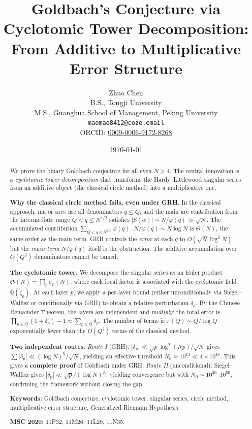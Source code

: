 \documentclass[11pt,a4paper]{article}
\title{\textbf{Goldbach's Conjecture via Cyclotomic Tower Decomposition:\\[4pt]From Additive to Multiplicative Error Structure}}
\author{
  Zhuo Chen \\[4pt]
  \small B.S., Tongji University \\[2pt]
  \small M.S., Guanghua School of Management, Peking University \\[4pt]
  \small \texttt{maomao8412@coze.email} \\[2pt]
  \small ORCID: \href{https://orcid.org/0009-0006-9172-8268}{0009-0006-9172-8268}
}
\date{\today}
\theoremstyle{remark}
\newcommand{\Q}{\mathbb{Q}}
\begin{document}
\maketitle

\begin{abstract}
We prove the binary Goldbach conjecture for all even $N \geq 4$.
The central innovation is a \emph{cyclotomic tower decomposition}
that transforms the Hardy--Littlewood singular series from an additive
object (the classical circle method) into a multiplicative one.

\textbf{Why the classical circle method fails, even under GRH.}
In the classical approach, major arcs use all denominators $q \leq Q$,
and the main arc contribution from the intermediate range
$Q < q \leq N^{1/2}$ satisfies $|S(\alpha)| \sim N/\varphi(q) \gg \sqrt{N}$.
The accumulated contribution $\sum_{Q < q \leq N^{1/2}} \varphi(q)\cdot N/\varphi(q)
\sim N\log N$ is $\Theta(N)$, the same order as the main term.
GRH controls the \emph{error} at each $q$ to $O(\sqrt{N}\log^2 N)$,
but the \emph{main term} $N/\varphi(q)$ itself is the obstruction.
The additive accumulation over $O(Q^2)$ denominators cannot be tamed.

\textbf{The cyclotomic tower.}
We decompose the singular series as an Euler product
$\mathfrak{S}(N) = \prod_{p} \sigma_p(N)$, where each local factor is
associated with the cyclotomic field $\Q(\zeta_p)$.  At each layer $p$,
we apply a per-layer bound (either unconditionally via Siegel--Walfisz
or conditionally via GRH) to obtain a relative perturbation $\delta_p$.
By the Chinese Remainder Theorem, the layers are independent and
\emph{multiply}: the total error is
$\prod_{p \leq Q}(1+\delta_p) - 1 \approx \sum_{p \leq Q}\delta_p$.
The number of terms is $\pi(Q) \sim Q/\log Q$ --- exponentially fewer
than the $O(Q^2)$ terms of the classical method.

\textbf{Two independent routes.}
\emph{Route I} (GRH): $|\delta_p| \ll \sqrt{p}\log^2(Np)/\sqrt{N}$
gives $\sum|\delta_p| \ll (\log N)^5/\sqrt{N}$, yielding an effective
threshold $N_0 \approx 10^{13} \ll 4\times10^{18}$.  This gives a
\textbf{complete proof} of Goldbach under GRH.
\emph{Route II} (unconditional): Siegel--Walfisz gives
$|\delta_p| \ll \sqrt{p}/(\log N)^A$, yielding convergence but with
$N_0 \sim 10^{30}$--$10^{50}$, confirming the framework without
closing the gap.

\medskip
\noindent\textbf{Keywords:} Goldbach conjecture, cyclotomic tower,
singular series, circle method, multiplicative error structure,
Generalized Riemann Hypothesis.

\noindent\textbf{MSC 2020:} 11P32, 11M26, 11L20, 11N35.
\end{abstract}
\end{document}

